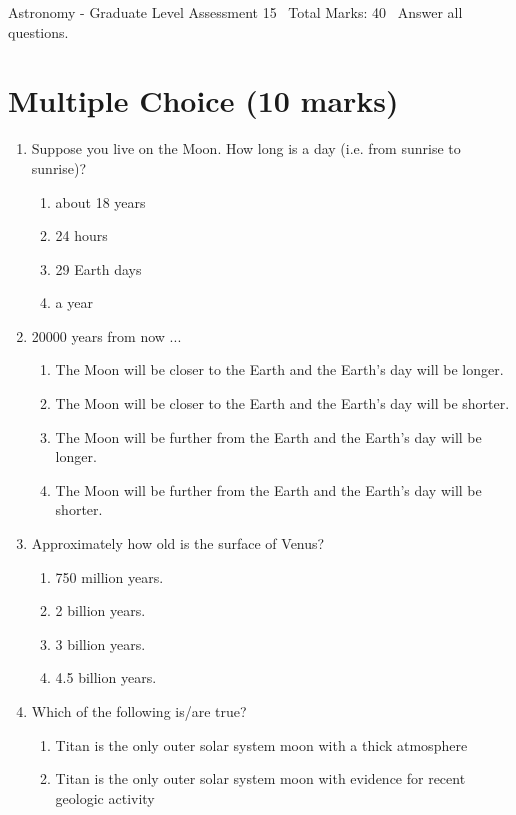 \documentclass[12pt]{article}
\begin{document}
\begin{center}
Astronomy - Graduate Level Assessment 15 \
Total Marks: 40 \
Answer all questions.
\end{center}

\section*{Multiple Choice (10 marks)}
\begin{enumerate}[label=\arabic*.]
\item Suppose you live on the Moon. How long is a day (i.e. from sunrise to sunrise)?
\begin{enumerate}[label=(\alph*)]
    \item about 18 years
    \item 24 hours
    \item 29 Earth days
    \item a year
\end{enumerate}
\item 20000 years from now ...
\begin{enumerate}[label=(\alph*)]
    \item The Moon will be closer to the Earth and the Earth's day will be longer.
    \item The Moon will be closer to the Earth and the Earth's day will be shorter.
    \item The Moon will be further from the Earth and the Earth's day will be longer.
    \item The Moon will be further from the Earth and the Earth's day will be shorter.
\end{enumerate}
\item Approximately how old is the surface of Venus?
\begin{enumerate}[label=(\alph*)]
    \item 750 million years.
    \item 2 billion years.
    \item 3 billion years.
    \item 4.5 billion years.
\end{enumerate}
\item Which of the following is/are true?
\begin{enumerate}[label=(\alph*)]
    \item Titan is the only outer solar system moon with a thick atmosphere
    \item Titan is the only outer solar system moon with evidence for recent geologic activity

\end{enumerate}
\end{enumerate}
\end{document}
